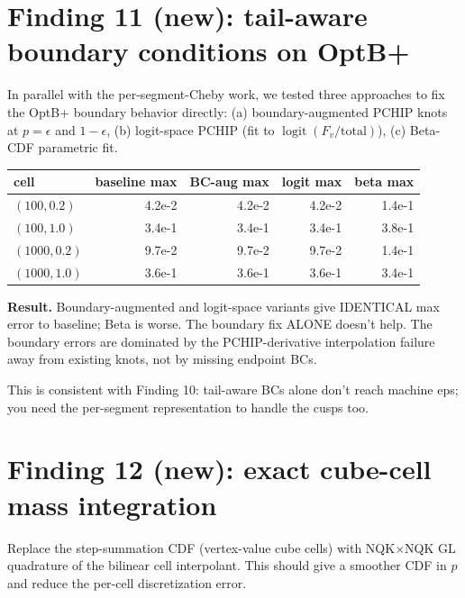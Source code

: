 \documentclass[11pt]{article}
\begin{document}
\section{Finding 11 (new): tail-aware boundary conditions on OptB+}

In parallel with the per-segment-Cheby work, we tested three approaches
to fix the OptB+ boundary behavior directly: (a) boundary-augmented
PCHIP knots at $p = \epsilon$ and $1-\epsilon$, (b) logit-space PCHIP
(fit to $\operatorname{logit}(F_v / \text{total})$), (c) Beta-CDF
parametric fit.

\begin{center}\begin{tabular}{lrrrr}\toprule
cell & baseline max & BC-aug max & logit max & beta max \\
\midrule
$(100, 0.2)$  & 4.2e-2 & 4.2e-2 & 4.2e-2 & 1.4e-1 \\
$(100, 1.0)$  & 3.4e-1 & 3.4e-1 & 3.4e-1 & 3.8e-1 \\
$(1000, 0.2)$ & 9.7e-2 & 9.7e-2 & 9.7e-2 & 1.4e-1 \\
$(1000, 1.0)$ & 3.6e-1 & 3.6e-1 & 3.6e-1 & 3.4e-1 \\
\bottomrule\end{tabular}\end{center}

\textbf{Result.} Boundary-augmented and logit-space variants give
IDENTICAL max error to baseline; Beta is worse. The boundary fix
ALONE doesn't help. The boundary errors are dominated by the
PCHIP-derivative interpolation failure away from existing knots, not
by missing endpoint BCs.

This is consistent with Finding 10: tail-aware BCs alone don't reach
machine eps; you need the per-segment representation to handle the
cusps too.

\section{Finding 12 (new): exact cube-cell mass integration}

Replace the step-summation CDF (vertex-value cube cells) with
NQK$\times$NQK GL quadrature of the bilinear cell interpolant. This
should give a smoother CDF in $p$ and reduce the per-cell
discretization error.
\end{document}
